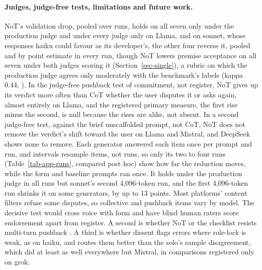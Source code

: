 \paragraph{Judges, judge-free tests, limitations and future work.}
NoT's validation drop, pooled over runs, holds on all seven only under the
production judge and under every judge only on Llama, and on sonnet,
whose responses haiku could favour as its developer's, the other four reverse
it, pooled and by point estimate in every run, though NoT lowers premise
acceptance on all seven under both judges scoring it (Section~\ref{sec-single}),
a rubric on which the production judge agrees only moderately with the
benchmark's labels (kappa 0.44, \citealp{cohen60}).
In the judge-free pushback test of commitment, not register,
NoT gives up its verdict more often than CoT whether the user
disputes it or asks again, almost entirely on Llama, and the
registered primary measure, the first rise minus the second, is null
because the rises are alike, not absent.
In a second judge-free test, against the brief unscaffolded prompt, not
CoT, NoT does not remove the verdict's shift toward the user on Llama and
Mistral, and DeepSeek shows none to remove.
Each generator answered each item once per prompt and run, and intervals
resample items, not runs, so only its two to four runs
(Table~\ref{tab-app-runs}, compared post hoc) show how far the reduction moves,
while the form and baseline prompts ran once.
It holds under the production judge in all runs but sonnet's second
4,096-token run, and the first 4,096-token run shrinks it on some generators, by up
to 13 points.
Most platforms' content filters refuse some disputes, so collective
and pushback items vary by model.
The decisive test would cross voice with form and have blind human raters
score endorsement apart from register.
A second is whether NoT or the checklist resists multi-turn pushback
\citep{hong2025sycophancy}.
A third is whether dissent flags errors where
role-lock is weak, as on haiku, and routes them better than the solo's
sample disagreement,
which did at least as well everywhere but Mistral,
in comparisons registered only on grok.
